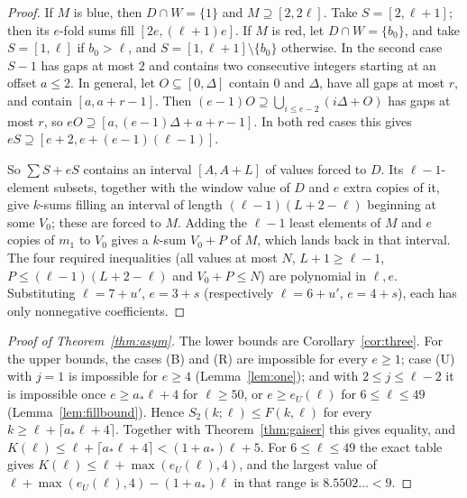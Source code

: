 \documentclass[11pt]{amsart}
\theoremstyle{definition}
\newcommand{\F}{F}
\newcommand{\Stwo}{S_2}
\begin{document}
\begin{proof}
If $M$ is blue, then $D\cap W=\{1\}$ and $M\supseteq[2,2\ell]$. Take $S=[2,\ell+1]$; then its $e$-fold sums fill $[2e,(\ell+1)e]$. If $M$ is red, let $D\cap W=\{b_0\}$, and take $S=[1,\ell]$ if $b_0>\ell$, and $S=[1,\ell+1]\setminus\{b_0\}$ otherwise. In the second case $S-1$ has gaps at most $2$ and contains two consecutive integers starting at an offset $a\le2$. In general, let $O\subseteq[0,\Delta]$ contain $0$ and $\Delta$, have all gaps at most $r$, and contain $[a,a+r-1]$. Then $(e-1)O\supseteq\bigcup_{i\le e-2}(i\Delta+O)$ has gaps at most $r$, so $eO\supseteq[a,(e-1)\Delta+a+r-1]$. In both red cases this gives $eS\supseteq[e+2,e+(e-1)(\ell-1)]$.

So $\sum S+eS$ contains an interval $[A,A+L]$ of values forced to $D$. Its $\ell-1$-element subsets, together with the window value of $D$ and $e$ extra copies of it, give $k$-sums filling an interval of length $(\ell-1)(L+2-\ell)$ beginning at some $V_0$; these are forced to $M$. Adding the $\ell-1$ least elements of $M$ and $e$ copies of $m_1$ to $V_0$ gives a $k$-sum $V_0+P$ of $M$, which lands back in that interval. The four required inequalities (all values at most $N$, $L+1\ge\ell-1$, $P\le(\ell-1)(L+2-\ell)$ and $V_0+P\le N$) are polynomial in $\ell,e$. Substituting $\ell=7+u'$, $e=3+s$ (respectively $\ell=6+u'$, $e=4+s$), each has only nonnegative coefficients.
\end{proof}

\begin{proof}[Proof of Theorem~\ref{thm:asym}]
The lower bounds are Corollary~\ref{cor:three}. For the upper bounds, the cases (B) and (R) are impossible for every $e\ge1$; case (U) with $j=1$ is impossible for $e\ge4$ (Lemma~\ref{lem:one}); and with $2\le j\le\ell-2$ it is impossible once $e\ge a_*\ell+4$ for $\ell\ge50$, or $e\ge e_U(\ell)$ for $6\le\ell\le49$ (Lemma~\ref{lem:fillbound}). Hence $\Stwo(k;\ell)\le\F(k,\ell)$ for every $k\ge\ell+\lceil a_*\ell+4\rceil$. Together with Theorem~\ref{thm:gaiser} this gives equality, and $K(\ell)\le\ell+\lceil a_*\ell+4\rceil<(1+a_*)\ell+5$. For $6\le\ell\le49$ the exact table gives $K(\ell)\le\ell+\max(e_U(\ell),4)$, and the largest value of $\ell+\max(e_U(\ell),4)-(1+a_*)\ell$ in that range is $8.5502\ldots<9$.
\end{proof}
\end{document}
